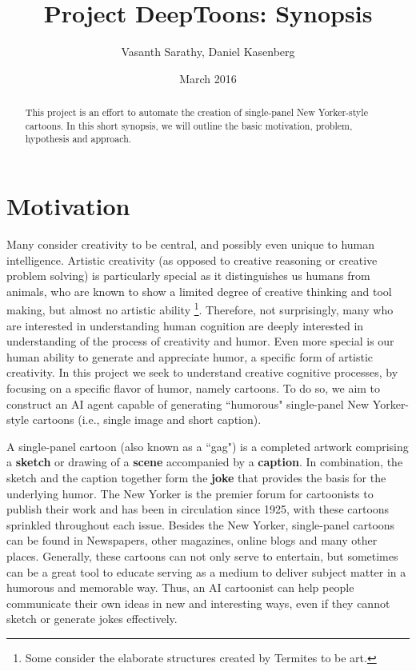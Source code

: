 \documentclass[letter]{article}
\title{Project DeepToons: Synopsis}
\author{Vasanth Sarathy, Daniel Kasenberg}
\date{March 2016}
\begin{document}
\maketitle

\sloppy

\begin{abstract}
This project is an effort to automate the creation of single-panel New Yorker-style cartoons. In this short synopsis, we will outline the basic motivation, problem, hypothesis and approach.
\end{abstract}

\section{Motivation}
Many consider creativity to be central, and possibly even unique to human intelligence. Artistic creativity (as opposed to creative reasoning or creative problem solving) is particularly special as it distinguishes us humans from animals, who are known to show a limited degree of creative thinking and tool making, but almost no artistic ability \footnote{Some consider the elaborate structures created by Termites to be art.}. Therefore, not surprisingly, many who are interested in understanding human cognition are deeply interested in understanding of the process of creativity and humor. Even more special is our human ability to generate and appreciate humor, a specific form of artistic creativity. In this project we seek to understand creative cognitive processes, by focusing on a specific flavor of humor, namely cartoons. To do so, we aim to construct an AI agent capable of generating ``humorous" single-panel New Yorker-style cartoons (i.e., single image and short caption). 

A single-panel cartoon (also known as a ``gag") is a completed artwork comprising a \textbf{sketch} or drawing of a \textbf{scene} accompanied by a \textbf{caption}. In combination, the sketch and the caption together form the \textbf{joke} that provides the basis for the underlying humor. The New Yorker is the premier forum for cartoonists to publish their work and has been in circulation since 1925, with these cartoons sprinkled throughout each issue. Besides the New Yorker, single-panel cartoons can be found in Newspapers, other magazines, online blogs and many other places. Generally, these cartoons can not only serve to entertain, but sometimes can be a great tool to educate serving as a medium to deliver subject matter in a humorous and memorable way. Thus, an AI cartoonist can help people communicate their own ideas in new and interesting ways, even if they cannot sketch or generate jokes effectively. 
\end{document}
